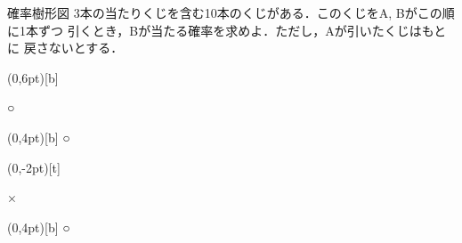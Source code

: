 \begin{itemsquarebox}{確率樹形図}
3本の当たりくじを含む10本のくじがある．このくじをA, Bがこの順に1本ずつ
引くとき，Bが当たる確率を求めよ．ただし，Aが引いたくじはもとに
戻さないとする．
\end{itemsquarebox}
{%

\hspace{5\zw}
\begin{zyukeizu}%
\eda[$\frac{3}{10}$](0,6pt)[b]{ ○ %
	\begin{zyukeizu}%
	\eda[$\frac29$](0,4pt)[b]{ ○ }%
	\end{zyukeizu}%
}%
\eda[$\frac{7}{10}$](0,-2pt)[t]{ × %
	\begin{zyukeizu}%
	\eda[$\frac39$](0,4pt)[b]{ ○ }%
	\eda[$\frac69$][t]{ × }%
	\end{zyukeizu}%
}%
\end{zyukeizu}%
}
